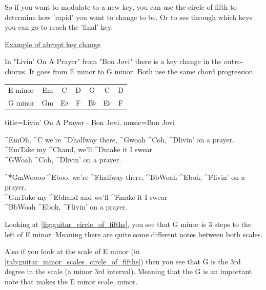 So if you want to modulate to a new key, you can use the circle of fifth to determine how 'rapid' you want to change to be. Or to see through which keys you can go to reach the 'final' key.

\underline{Example of abrupt key change}

In "Livin' On A Prayer" from "Bon Jovi" there is a key change in the outro-chorus. It goes from E minor to G minor. Both use the same chord progression.

\begin{table}[h]
	\centering
	\begin{NiceTabular}{|l|c|c|c|c|c|c|}
		\hline
		 &  &  &  &  &  &  \\
		\hline
		E minor & Em & C & D & G & C & D \\
		\hline
		G minor & Gm & E$\flat$ & F & B$\flat$ & E$\flat$ & F \\
		\hline
	\end{NiceTabular}
\end{table}


\begin{song}[verse/numbered, align-chords=l]{title={Livin' On A Prayer - Bon Jovi}, music={Bon Jovi}}
	\begin{chorus}
		^{Em}Oh, ^{C} we're ^{D}halfway there, ^{G}woah ^{C}oh, ^{D}livin' on a prayer. \\
		^{Em}Take my ^{C}hand, we'll ^{D}make it I swear \\
		^{G}Woah ^{C}oh, ^{D}livin' on a prayer. \\
	\end{chorus}
	
	\begin{outro-chorus}
		^*{Gm}Woooo ^{Eb}oo, we're ^{F}halfway there, ^{Bb}Woah ^{Eb}oh, ^{F}livin' on a prayer. \\
		^{Gm}Take my ^{Eb}hand and we'll ^{F}make it I swear \\
		^{Bb}Woah ^{Eb}oh, ^{F}livin' on a prayer. \\
	\end{outro-chorus}
\end{song}

Looking at \autoref{fig:guitar_circle_of_fifths}, you see that G minor is 3 steps to the left of E minor. Meaning there are quite some different notes between both scales.

Also if you look at the scale of E minor (in \autoref{tab:guitar_minor_scales_circle_of_fifths}) then you see that G is the 3rd degree in the scale (a minor 3rd interval). Meaning that the G is an important note that makes the E minor scale, minor.


